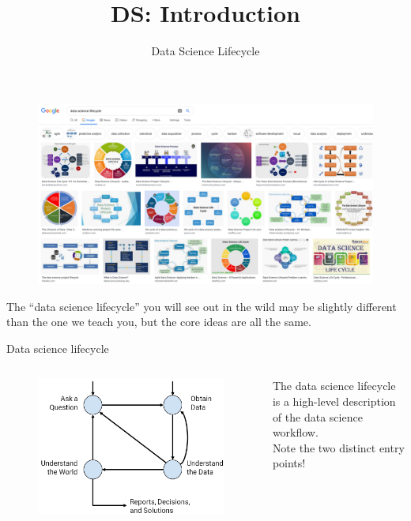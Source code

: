 \documentclass[aspectratio=169]{../latex_main/tntbeamer}  %
\title[Introduction]{DS: Introduction}
\subtitle{Data Science Lifecycle}
\begin{document}
	
	\maketitle

    \begin{frame}[c]{}

        \begin{figure}
            \includegraphics[scale=.6]{bild15}
        \end{figure}
        The “data science lifecycle” you will see out in the wild may be slightly different than the one we teach you, but the core ideas are all the same.

    \end{frame}

    \begin{frame}{Data science lifecycle}
        \begin{columns}
        \begin{column}{.6\textwidth}
            \begin{figure}
                \includegraphics[scale=.35]{bild16}
            \end{figure}
        \end{column}
        \begin{column}{.4\textwidth}
            The data science lifecycle is a high-level description of the data science workflow.\\
            Note the two distinct entry points!
        \end{column}
        \end{columns}
    \end{frame}
\end{document}
